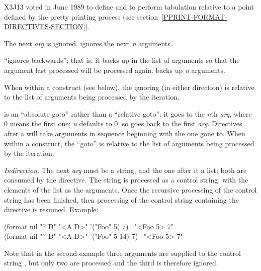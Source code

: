\begin{flushdesc}
\begin{new}
X3J13 voted in June 1989  to define 
and  to perform tabulation relative to a point defined
by the pretty printing process (see section~\ref{PPRINT-FORMAT-DIRECTIVES-SECTION}).
\end{new}

\item[\cd{{\Xtilde}*}]
The next \emph{arg} is ignored.   ignores the next \emph{n} arguments.

\cd{{\Xtilde}:*} ``ignores backwards''; that is, it backs up in the list of
arguments so that the argument last processed will be processed again.
 backs up \emph{n} arguments.

When within a \cd{{\Xtilde}{\Xlbrace}} construct
(see below), the ignoring (in either direction) is relative to the list
of arguments being processed by the iteration.

 is an ``absolute goto'' rather than a ``relative goto'':
it goes to the \emph{n}th \emph{arg}, where 0 means the first one;
\emph{n} defaults to 0, so \cd{{\Xtilde}{\Xatsign}*} goes back to the first \emph{arg}.
Directives after a 
will take arguments in sequence beginning with the one gone to.
When within a \cd{{\Xtilde}{\Xlbrace}} construct, the ``goto''
is relative to the list of arguments being processed by the iteration.

\item[\cd{{\Xtilde}?}]
\emph{Indirection}.
The next \emph{arg} must be a string, and the one after it a list;
both are consumed by the  directive.
The string is processed as a  control string, with the
elements of the list as the arguments.  Once the recursive processing
of the control string has been finished, then processing of the control
string containing the  directive is resumed.
Example:
\begin{lisp}
(format nil "{\Xtilde}? {\Xtilde}D" "<{\Xtilde}A {\Xtilde}D>" '("Foo" 5) 7) \EV\ "<Foo 5> 7" \\
(format nil "{\Xtilde}? {\Xtilde}D" "<{\Xtilde}A {\Xtilde}D>" '("Foo" 5 14) 7) \EV\ "<Foo 5> 7"
\end{lisp}
Note that in the second example three arguments are supplied
to the control string , but only two are processed
and the third is therefore ignored.


\end{flushdesc}
